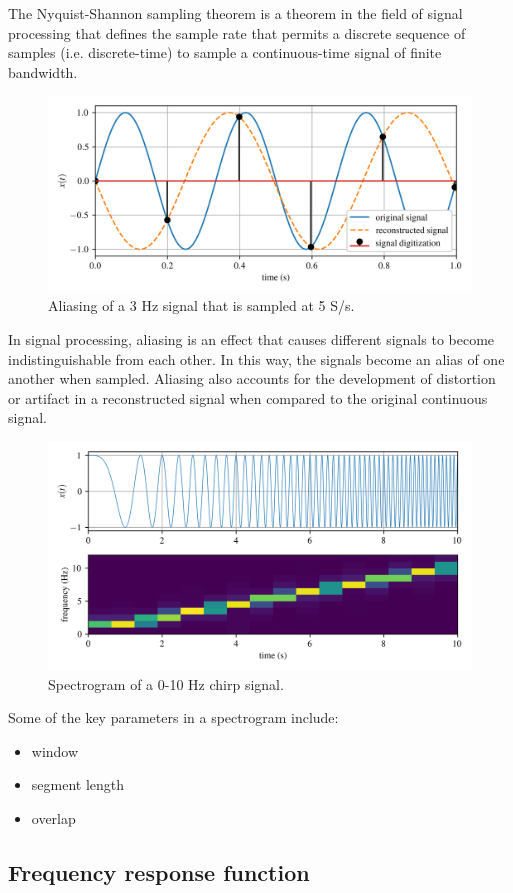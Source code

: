 \documentclass[12pt,letter]{article}
\begin{document}
The Nyquist-Shannon sampling theorem is a theorem in the field of signal processing that defines the sample rate that permits a discrete sequence of samples (i.e. discrete-time) to sample a continuous-time signal of finite bandwidth. 

\begin{figure}[H]
    \centering
    \includegraphics[width=6.5in]{../figures/aliasing.png}
    \caption{Aliasing of a 3 Hz signal that is sampled at 5 S/s.}
    \label{fig:aliasing}
\end{figure}

In signal processing, aliasing is an effect that causes different signals to become indistinguishable from each other.  In this way, the signals become an alias of one another when sampled. Aliasing also accounts for the development of distortion or artifact in a reconstructed signal when compared to the original continuous signal.


\begin{figure}[H]
    \centering
    \includegraphics[width=6.5in]{../figures/spectrogram.png}
    \caption{Spectrogram of a 0-10 Hz chirp signal.}
    \label{fig:spectrogram}
\end{figure}

Some of the key parameters in a spectrogram include:

\begin{itemize}
\item window
\item segment length
\item overlap
\end{itemize}


\subsection{Frequency response function}
\end{document}
